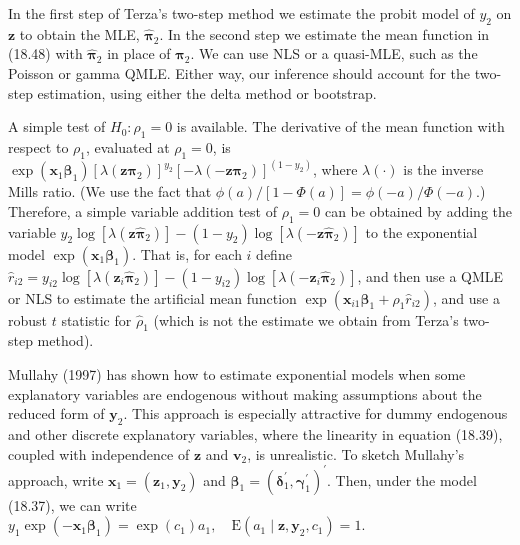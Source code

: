 \documentclass[10pt]{article}
\begin{document}
In the first step of Terza's two-step method we estimate the probit model of $y_{2}$ on $\mathbf{z}$ to obtain the MLE, $\hat{\boldsymbol{\pi}}_{2}$. In the second step we estimate the mean function in (18.48) with $\hat{\boldsymbol{\pi}}_{2}$ in place of $\boldsymbol{\pi}_{2}$. We can use NLS or a quasi-MLE, such as the Poisson or gamma QMLE. Either way, our inference should account for the two-step estimation, using either the delta method or bootstrap.

A simple test of $H_{0}: \rho_{1}=0$ is available. The derivative of the mean function with respect to $\rho_{1}$, evaluated at $\rho_{1}=0$, is $\exp \left(\mathbf{x}_{1} \boldsymbol{\beta}_{1}\right)\left[\lambda\left(\mathbf{z} \boldsymbol{\pi}_{2}\right)\right]^{y_{2}}\left[-\lambda\left(-\mathbf{z} \boldsymbol{\pi}_{2}\right)\right]^{\left(1-y_{2}\right)}$, where $\lambda(\cdot)$ is the inverse Mills ratio. (We use the fact that $\phi(a) /[1-\Phi(a)]=\phi(-a) / \Phi(-a)$.) Therefore, a simple variable addition test of $\rho_{1}=0$ can be obtained by adding the variable $y_{2} \log \left[\lambda\left(\mathbf{z} \hat{\boldsymbol{\pi}}_{2}\right)\right]-\left(1-y_{2}\right) \log \left[\lambda\left(-\mathbf{z} \hat{\boldsymbol{\pi}}_{2}\right)\right]$ to the exponential model $\exp \left(\mathbf{x}_{1} \boldsymbol{\beta}_{1}\right)$. That is, for each $i$ define $\hat{r}_{i 2}=y_{i 2} \log \left[\lambda\left(\mathbf{z}_{i} \hat{\boldsymbol{\pi}}_{2}\right)\right]-\left(1-y_{i 2}\right) \log \left[\lambda\left(-\mathbf{z}_{i} \hat{\boldsymbol{\pi}}_{2}\right)\right]$, and then use a QMLE or NLS to estimate the artificial mean function $\exp \left(\mathbf{x}_{i 1} \boldsymbol{\beta}_{1}+\rho_{1} \hat{r}_{i 2}\right)$, and use a robust $t$ statistic for $\hat{\rho}_{1}$ (which is not the estimate we obtain from Terza's two-step method).

Mullahy (1997) has shown how to estimate exponential models when some explanatory variables are endogenous without making assumptions about the reduced form of $\mathbf{y}_{2}$. This approach is especially attractive for dummy endogenous and other discrete explanatory variables, where the linearity in equation (18.39), coupled with independence of $\mathbf{z}$ and $\mathbf{v}_{2}$, is unrealistic. To sketch Mullahy's approach, write $\mathbf{x}_{1}= \left(\mathbf{z}_{1}, \mathbf{y}_{2}\right)$ and $\boldsymbol{\beta}_{1}=\left(\boldsymbol{\delta}_{1}^{\prime}, \boldsymbol{\gamma}_{1}^{\prime}\right)^{\prime}$. Then, under the model (18.37), we can write\\
$y_{1} \exp \left(-\mathbf{x}_{1} \boldsymbol{\beta}_{1}\right)=\exp \left(c_{1}\right) a_{1}, \quad \mathrm{E}\left(a_{1} \mid \mathbf{z}, \mathbf{y}_{2}, c_{1}\right)=1$.
\end{document}
